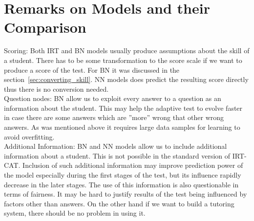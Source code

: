\section{Remarks on Models and their Comparison}
Scoring: Both IRT and BN models usually produce assumptions about the skill of a student. There has to be some transformation to the score scale if we want to produce a score of the test. For BN it was discussed in the section~\ref{sec:converting_skill}. NN models does predict the resulting score directly thus there is no conversion needed.\\
Question nodes: BN allow us to exploit every answer to a question as an information about the student. This may help the adaptive test to evolve faster in case there are some answers which are ''more'' wrong that other wrong answers. As was mentioned above it requires large data samples for learning to avoid overfitting.\\
Additional Information: BN and NN models allow us to include additional information about a student. This is not possible in the standard version of IRT-CAT. Inclusion of such additional information may improve prediction power of the model especially during the first stages of the test, but its influence rapidly decrease in the later stages. The use of this information is also questionable in terms of fairness. It may be hard to justify results of the test being influenced by factors other than answers. On the other hand if we want to build a tutoring system, there should be no problem in using it.